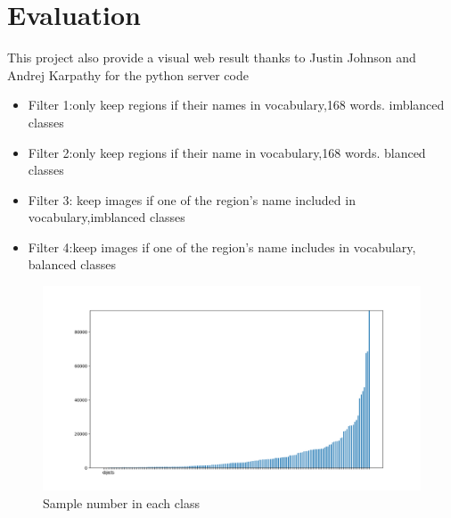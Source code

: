 \documentclass[12pt,a4paper]{report}
\begin{document}
\newpage

\section{Evaluation}
This project also provide a visual web result thanks to Justin Johnson and Andrej Karpathy  for the python server code\cite{webinterface}
\begin{itemize}
\item  Filter 1:only keep regions if their names in vocabulary,168 words. imblanced classes
\item  Filter 2:only keep regions if their name in vocabulary,168 words. blanced classes
\item Filter 3: keep images if one of the region's name included in vocabulary,imblanced classes
\item  Filter 4:keep images if one of the region's name includes in vocabulary, balanced classes

\end{itemize}


\begin{figure}[h]
\centering
\includegraphics[width=0.9\linewidth]{objects_dis.png}
\caption{Sample number in each class}
\end{figure}
\end{document}
